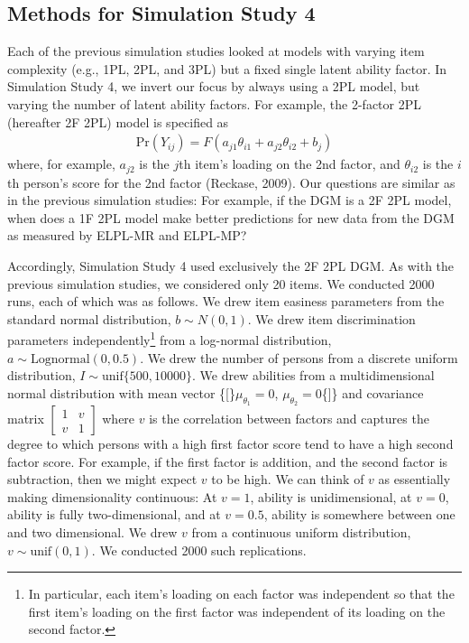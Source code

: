 \documentclass[
  english,
  man,floatsintext]{apa7}
\begin{document}
\hypertarget{methods-for-simulation-study-4}{%
\subsection{Methods for Simulation Study 4}\label{methods-for-simulation-study-4}}

Each of the previous simulation studies looked at models with varying item complexity (e.g., 1PL, 2PL, and 3PL) but a fixed single latent ability factor. In Simulation Study 4, we invert our focus by always using a 2PL model, but varying the number of latent ability factors. For example, the 2-factor 2PL (hereafter 2F 2PL) model is specified as
\begin{align}
\text{Pr}(Y_{ij}) = F(a_{j1}\theta_{i1} + a_{j2} \theta_{i2} + b_j)
\end{align}
where, for example, \(a_{j2}\) is the \(j\)th item's loading on the 2nd factor, and \(\theta_{i2}\) is the \(i\)th person's score for the 2nd factor (Reckase, 2009). Our questions are similar as in the previous simulation studies: For example, if the DGM is a 2F 2PL model, when does a 1F 2PL model make better predictions for new data from the DGM as measured by ELPL-MR and ELPL-MP?

Accordingly, Simulation Study 4 used exclusively the 2F 2PL DGM. As with the previous simulation studies, we considered only 20 items. We conducted 2000 runs, each of which was as follows. We drew item easiness parameters from the standard normal distribution, \(b \sim N(0, 1)\). We drew item discrimination parameters independently\footnote{In particular, each item's loading on each factor was independent so that the first item's loading on the first factor was independent of its loading on the second factor.} from a log-normal distribution, \(a \sim \text{Lognormal}(0, 0.5)\). We drew the number of persons from a discrete uniform distribution, \(I \sim \text{unif}\{500, 10000\}\). We drew abilities from a multidimensional normal distribution with mean vector \{{[}\}\(\mu_{\theta_1} = 0\), \(\mu_{\theta_2} = 0\)\{{]}\} and covariance matrix \(\begin{bmatrix} 1 & v \\ v & 1 \end{bmatrix}\) where \(v\) is the correlation between factors and captures the degree to which persons with a high first factor score tend to have a high second factor score. For example, if the first factor is addition, and the second factor is subtraction, then we might expect \(v\) to be high. We can think of \(v\) as essentially making dimensionality continuous: At \(v = 1\), ability is unidimensional, at \(v = 0\), ability is fully two-dimensional, and at \(v = 0.5\), ability is somewhere between one and two dimensional. We drew \(v\) from a continuous uniform distribution, \(v \sim \text{unif}(0, 1)\). We conducted 2000 such replications.
\end{document}
